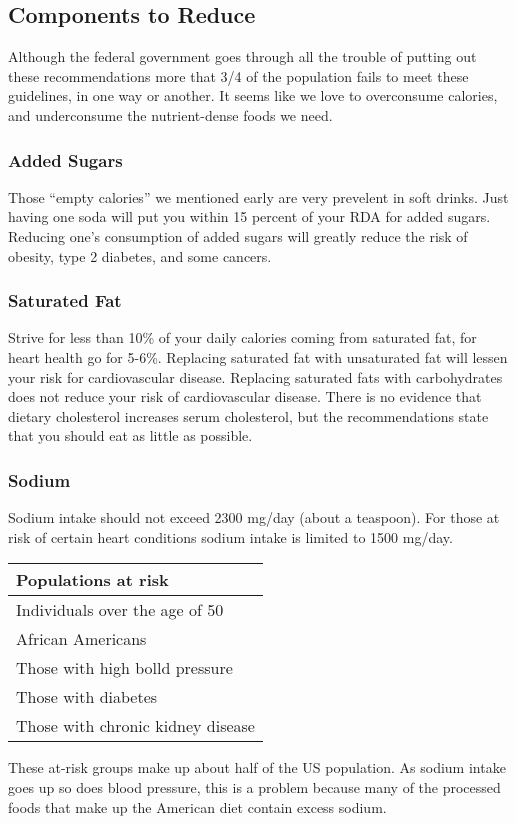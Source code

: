 \documentclass[letterpaper, 11pt]{article}
\begin{document}
\subsection{Components to Reduce}
\label{sec:org5b3bb5f}
Although the federal government goes through all the trouble of putting out these recommendations more that 3/4 of the population fails to meet these guidelines, in one way or another. It seems like we love to overconsume calories, and underconsume the nutrient-dense foods we need.\\
\subsubsection{Added Sugars}
\label{sec:orgf082fec}
Those ``empty calories'' we mentioned early are very prevelent in soft drinks. Just having one soda will put you within 15 percent of your RDA for added sugars. Reducing one's consumption of added sugars will greatly reduce the risk of obesity, type 2 diabetes, and some cancers.\\
\subsubsection{Saturated Fat}
\label{sec:org3639a15}
Strive for less than 10\% of your daily calories coming from saturated fat, for heart health go for 5-6\%. Replacing saturated fat with unsaturated fat will lessen your risk for cardiovascular disease. Replacing saturated fats with carbohydrates does not reduce your risk of cardiovascular disease. There is no evidence that dietary cholesterol increases serum cholesterol, but the recommendations state that you should eat as little as possible.\\
\subsubsection{Sodium}
\label{sec:orgc341d0c}
Sodium intake should not exceed 2300 mg/day (about a teaspoon). For those at risk of certain heart conditions sodium intake is limited to 1500 mg/day.\\
\begin{center}
\begin{tabular}{l}
Populations at risk\\
\hline
Individuals over the age of 50\\
African Americans\\
Those with high bolld pressure\\
Those with diabetes\\
Those with chronic kidney disease\\
\end{tabular}
\end{center}
These at-risk groups make up about half of the US population. As sodium intake goes up so does blood pressure, this is a problem because many of the processed foods that make up the American diet contain excess sodium.\\
\end{document}
